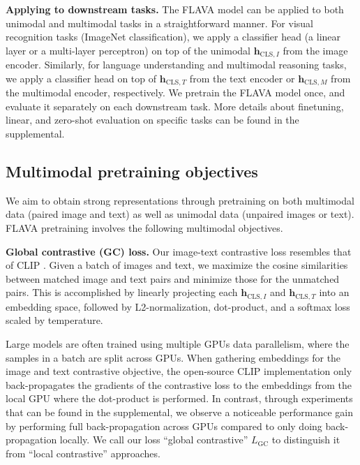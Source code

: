 \documentclass[10pt,twocolumn,letterpaper]{article}
\newcommand{\myparagraph}[1]{\vspace{0.25em}\noindent\textbf{#1}}
\begin{document}
\myparagraph{Applying to downstream tasks.} The FLAVA model can be applied to both unimodal and multimodal tasks in a straightforward manner. For visual recognition tasks (\eg ImageNet classification), we apply a classifier head (\eg a linear layer or a multi-layer perceptron) on top of the unimodal $\mathbf{h}_{\mathrm{CLS},I}$ from the image encoder. Similarly, for language understanding and multimodal reasoning tasks, we apply a classifier head on top of $\mathbf{h}_{\mathrm{CLS},T}$ from the text encoder or $\mathbf{h}_{\mathrm{CLS},M}$ from the multimodal encoder, respectively. We pretrain the FLAVA model once, and evaluate it separately on each downstream task. More details about finetuning, linear, and zero-shot evaluation on specific tasks can be found in the supplemental.

\subsection{Multimodal pretraining objectives}
\label{sec:multimodal}

We aim to obtain strong representations through pretraining on both multimodal data (paired image and text) as well as unimodal data (unpaired images or text). FLAVA pretraining involves the following multimodal objectives.

\myparagraph{Global contrastive (GC) loss.} Our image-text contrastive loss resembles that of CLIP \cite{radford2021learning}. Given a batch of images and text, we maximize the cosine similarities between matched image and text pairs and minimize those for the unmatched pairs. This is accomplished by linearly projecting each $\mathbf{h}_{\mathrm{CLS},I}$ and $\mathbf{h}_{\mathrm{CLS},T}$ into an embedding space, followed by L2-normalization, dot-product, and a softmax loss scaled by temperature.

Large models are often trained using multiple GPUs data parallelism, where the samples in a batch are split across GPUs. When gathering embeddings for the image and text contrastive objective, the open-source CLIP implementation \cite{ilharco_gabriel_2021_5143773} only back-propagates the gradients of the contrastive loss to the embeddings from the local GPU where the dot-product is performed. In contrast, through experiments that can be found in the supplemental, we observe a noticeable performance gain by performing full back-propagation across GPUs compared to only doing back-propagation locally. We call our loss ``global contrastive'' $L_{\mathrm{GC}}$ to distinguish it from ``local contrastive'' approaches.
\end{document}
